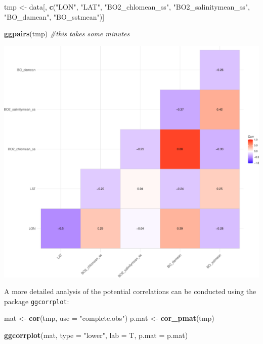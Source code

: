\documentclass[
]{book}
\newenvironment{Shaded}{\begin{snugshade}}{\end{snugshade}}
\newcommand{\AttributeTok}[1]{\textcolor[rgb]{0.13,0.29,0.53}{#1}}
\newcommand{\CommentTok}[1]{\textcolor[rgb]{0.56,0.35,0.01}{\textit{#1}}}
\newcommand{\FunctionTok}[1]{\textcolor[rgb]{0.13,0.29,0.53}{\textbf{#1}}}
\newcommand{\NormalTok}[1]{#1}
\newcommand{\OtherTok}[1]{\textcolor[rgb]{0.56,0.35,0.01}{#1}}
\newcommand{\StringTok}[1]{\textcolor[rgb]{0.31,0.60,0.02}{#1}}
\begin{document}
\begin{Shaded}
\begin{Highlighting}[]
\NormalTok{tmp }\OtherTok{\textless{}{-}}\NormalTok{ data[, }\FunctionTok{c}\NormalTok{(}\StringTok{"LON"}\NormalTok{, }\StringTok{"LAT"}\NormalTok{, }\StringTok{"BO2\_chlomean\_ss"}\NormalTok{,}
    \StringTok{"BO2\_salinitymean\_ss"}\NormalTok{, }\StringTok{"BO\_damean"}\NormalTok{, }\StringTok{"BO\_sstmean"}\NormalTok{)]}

\FunctionTok{ggpairs}\NormalTok{(tmp)  }\CommentTok{\#this takes some minutes}
\end{Highlighting}
\end{Shaded}

\includegraphics{_main_files/figure-latex/unnamed-chunk-51-1.pdf}

A more detailed analysis of the potential correlations can be conducted using the package \texttt{ggcorrplot}:

\begin{Shaded}
\begin{Highlighting}[]
\NormalTok{mat }\OtherTok{\textless{}{-}} \FunctionTok{cor}\NormalTok{(tmp, }\AttributeTok{use =} \StringTok{"complete.obs"}\NormalTok{)}
\NormalTok{p.mat }\OtherTok{\textless{}{-}} \FunctionTok{cor\_pmat}\NormalTok{(tmp)}

\FunctionTok{ggcorrplot}\NormalTok{(mat, }\AttributeTok{type =} \StringTok{"lower"}\NormalTok{, }\AttributeTok{lab =}\NormalTok{ T,}
    \AttributeTok{p.mat =}\NormalTok{ p.mat)}
\end{Highlighting}
\end{Shaded}
\end{document}
